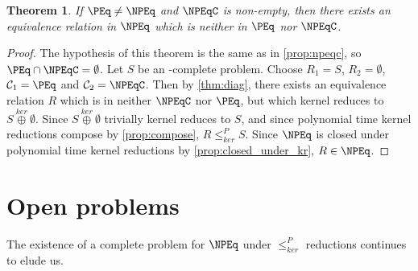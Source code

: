 \documentclass[draft]{article}
\newtheorem{theorem}{Theorem}[section]
\theoremstyle{definition} \newtheorem{openproblem}[openproblem]{Open problem}
\theoremstyle{definition} \newtheorem{definition}[definition]{Definition}
\newcommand{\kj}{\overset{ker}{\oplus}} %
\newcommand{\kr}{\leq^{P}_{ker}} %
\newcommand{\printintermediarytheorem}{If $\PEq\neq\NPEq$ and $\NPEqC$ is non-empty, then there exists an equivalence relation in $\NPEq$ which is neither in $\PEq$ nor $\NPEqC$.}
\begin{document}
\begin{theorem}\label{thm:intermediary}
  \printintermediarytheorem
\end{theorem}
\begin{proof}
  The hypothesis of this theorem is the same as in \autoref{prop:npeqc}, so $\PEq\cap\NPEqC=\emptyset$.
  Let $S$ be an \NPEq-complete problem.
  Choose $R_1=S$, $R_2=\emptyset$, $\mathcal{C}_1=\PEq$ and $\mathcal{C}_2=\NPEqC$.
  Then by \autoref{thm:diag}, there exists an equivalence relation $R$ which is in neither $\NPEqC$ nor $\PEq$, but which kernel reduces to $S\kj\emptyset$.
  Since $S\kj\emptyset$ trivially kernel reduces to $S$, and since polynomial time kernel reductions compose by \autoref{prop:compose}, $R\kr S$.
  Since $\NPEq$ is closed under polynomial time kernel reductions by \autoref{prop:closed_under_kr}, $R\in\NPEq$.
\end{proof}

\section{Open problems}
The existence of a complete problem for $\NPEq$ under $\kr$ reductions continues to elude us.

 
\end{document}
